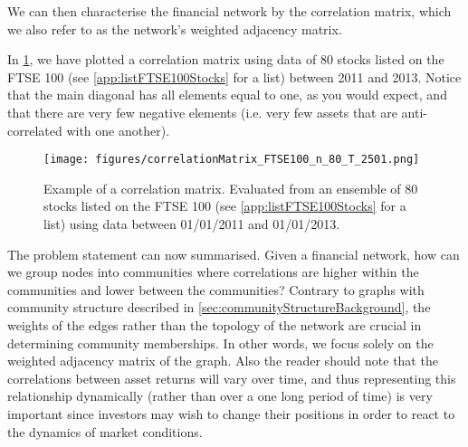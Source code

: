 We can then characterise the financial network by the correlation matrix, which we also refer to as the network's weighted adjacency matrix.

In \cref{fig:exampleCrossCorrelationMatrix}, we have plotted a correlation matrix using data of 80 stocks listed on the FTSE 100 (see \cref{app:listFTSE100Stocks} for a list) between 2011 and 2013. Notice that the main diagonal has all elements equal to one, as you would expect, and that there are very few negative elements (i.e. very few assets that are anti-correlated with one another).

\begin{figure}
	\centering
	\texttt{[image: figures/correlationMatrix\_FTSE100\_n\_80\_T\_2501.png]}
	\caption[Example plot for a correlation matrix]{\label{fig:exampleCrossCorrelationMatrix} Example of a correlation matrix. Evaluated from an ensemble of 80 stocks listed on the FTSE 100 (see \cref{app:listFTSE100Stocks} for a list) using data between 01/01/2011 and 01/01/2013.}
\end{figure}

The problem statement can now summarised.
Given a financial network, how can we group nodes into communities where correlations are higher within the communities and lower between the communities?
Contrary to graphs with community structure described in \cref{sec:communityStructureBackground}, the weights of the edges rather than the topology of the network are crucial in determining community memberships.
In other words, we focus solely on the weighted adjacency matrix of the graph.
Also the reader should note that the correlations between asset returns will vary over time, and thus representing this relationship dynamically (rather than over a one long period of time) is very important since investors may wish to change their positions in order to react to the dynamics of market conditions.
